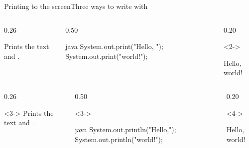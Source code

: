 \documentclass[\deckoptions]{beamer}
\begin{document}
\begin{frame}[fragile]{Printing to the screen}{Three ways to write with }
  \begin{boxrow}
  \begin{columns}[c, onlytextwidth]
    \begin{column}{0.26\textwidth}
      \begin{card}{}
        Prints the text and .
      \end{card}
    \end{column}
    \begin{column}{0.50\textwidth}
\begin{codeblock}{java}
System.out.print("Hello, ");
System.out.print("world!");
\end{codeblock}
    \end{column}
    \begin{column}{0.20\textwidth}
      \begin{uncoverenv}<2->
\begin{console}
Hello, world!
\end{console}
      \end{uncoverenv}
    \end{column}
  \end{columns}
  \end{boxrow}
  \boxrowgap
  \begin{boxrow}
  \begin{columns}[c, onlytextwidth]
    \begin{column}{0.26\textwidth}
      \begin{card}<3->{}
        Prints the text and .
      \end{card}
    \end{column}
    \begin{column}{0.50\textwidth}
      \begin{uncoverenv}<3->
\begin{codeblock}{java}
System.out.println("Hello,");
System.out.println("world!");
\end{codeblock}
      \end{uncoverenv}
    \end{column}
    \begin{column}{0.20\textwidth}
      \begin{uncoverenv}<4->
\begin{console}
Hello,
world!
\end{console}

\end{uncoverenv}
\end{column}
\end{columns}
\end{boxrow}
\end{frame}
\end{document}
